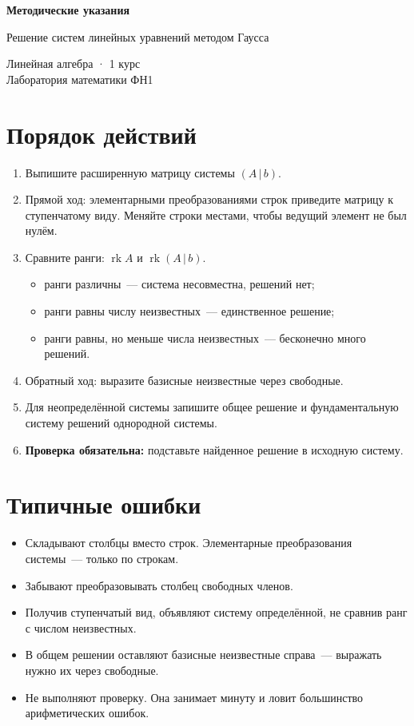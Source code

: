 \documentclass[12pt, a4paper]{article}
\begin{document}
\begin{center}
  {\large\bfseries Методические указания}

  \vspace{0.3em}
  {\large Решение систем линейных уравнений методом Гаусса}

  \vspace{0.5em}
  {\small Линейная алгебра · 1 курс\\ Лаборатория математики ФН1}
\end{center}
\vspace{1em}

\section*{Порядок действий}

\begin{enumerate}[nosep]
  \item Выпишите расширенную матрицу системы $(A\,|\,b)$.
  \item Прямой ход: элементарными преобразованиями строк приведите матрицу
        к ступенчатому виду. Меняйте строки местами, чтобы ведущий элемент не был нулём.
  \item Сравните ранги: $\operatorname{rk} A$ и $\operatorname{rk}(A\,|\,b)$.
        \begin{itemize}[nosep]
          \item ранги различны~--- система несовместна, решений нет;
          \item ранги равны числу неизвестных~--- единственное решение;
          \item ранги равны, но меньше числа неизвестных~--- бесконечно много решений.
        \end{itemize}
  \item Обратный ход: выразите базисные неизвестные через свободные.
  \item Для неопределённой системы запишите общее решение и фундаментальную
        систему решений однородной системы.
  \item \textbf{Проверка обязательна:} подставьте найденное решение в исходную систему.
\end{enumerate}

\section*{Типичные ошибки}

\begin{itemize}[nosep]
  \item Складывают столбцы вместо строк. Элементарные преобразования системы~--- только по строкам.
  \item Забывают преобразовывать столбец свободных членов.
  \item Получив ступенчатый вид, объявляют систему определённой, не сравнив ранг с числом неизвестных.
  \item В общем решении оставляют базисные неизвестные справа~--- выражать нужно их через свободные.
  \item Не выполняют проверку. Она занимает минуту и ловит большинство арифметических ошибок.
\end{itemize}
\end{document}
